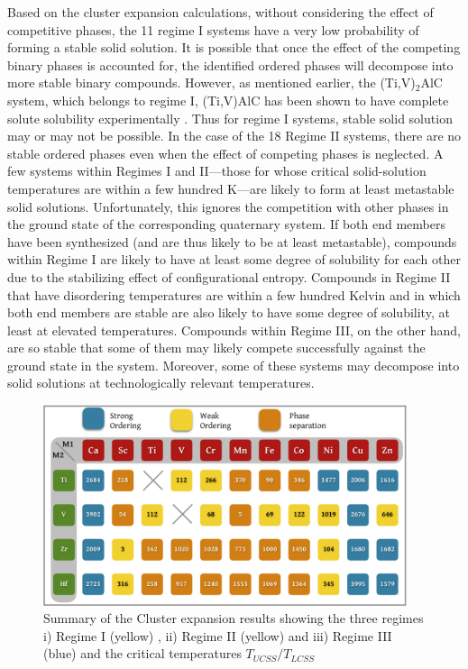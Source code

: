 \documentclass[preprint,amsmath,amssymb,aps, prb,showkeys]{revtex4-1}
\begin{document}
Based on the cluster expansion calculations, without considering the effect of competitive phases, the 11 regime I systems have a very low probability of forming a stable solid solution. It is possible that once the effect of the competing binary phases is accounted for, the identified ordered phases will decompose into more stable binary compounds. However, as mentioned earlier, the (Ti,V)$_2$AlC system, which belongs to regime I, (Ti,V)AlC has been shown to have complete solute solubility experimentally \cite{schuster1980ternary,meng2005strengthening,yeh2014combustion}. Thus for regime I systems, stable solid solution may or may not be possible.  In the case of the 18 Regime II systems, there are no stable ordered phases even when the effect of competing phases is neglected. A few systems within Regimes I and II---those for whose critical solid-solution temperatures are within a few hundred K---are likely to form at least metastable solid solutions. Unfortunately, this ignores the competition with other phases in the ground state of the corresponding quaternary system. If both end members have been synthesized (and are thus likely to be at least metastable), compounds within Regime I are likely to have at least some degree of solubility for each other due to the stabilizing effect of configurational entropy. Compounds in Regime II that have disordering temperatures are within a few hundred Kelvin and in which both end members are stable are also likely to have some degree of solubility, at least at elevated temperatures. Compounds within Regime III, on the other hand, are so stable that some of them may likely compete successfully against the ground state in the system. Moreover, some of these systems may decompose into solid solutions at technologically relevant temperatures. 


\begin{figure}[!htb]
\centering
\includegraphics[width=0.95\textwidth]{figure_13.pdf}
\caption{Summary of the Cluster expansion  results showing the three regimes i) Regime I (yellow) , ii) Regime II (yellow) and iii) Regime III (blue) and the critical temperatures $T_{UCSS}/T_{LCSS}$}
\label{fig:MAX_overall_results}
\end{figure}
\end{document}
